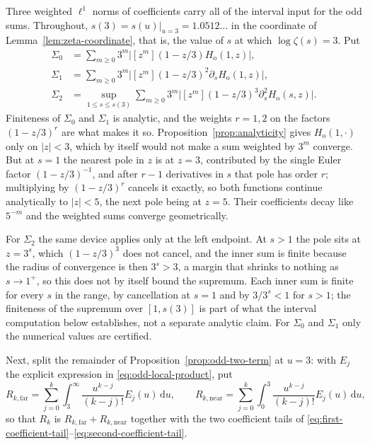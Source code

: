 \documentclass[11pt]{amsart}
\theoremstyle{plain}
\theoremstyle{definition}
\newcommand{\dd}{\,\mathrm d}
\newcommand{\abs}[1]{\lvert #1\rvert}
\begin{document}
Three weighted $\ell^1$ norms of coefficients carry all of the interval
input for the odd sums. Throughout, $s(3)=s(u)\rvert_{u=3}=1.0512\ldots$ in the
coordinate of Lemma~\ref{lem:zeta-coordinate}, that is, the value of $s$ at
which $\log\zeta(s)=3$. Put
\begin{equation}\label{eq:sigma-def}
\begin{aligned}
 \Sigma_0&=\sum_{m\geq0}3^m
   \abs{[z^m](1-z/3)H_{\mathrm o}(1,z)},\\
 \Sigma_1&=\sum_{m\geq0}3^m
   \abs{[z^m](1-z/3)^2\partial_sH_{\mathrm o}(1,z)},\\
 \Sigma_2&=\sup_{1\leq s\leq s(3)}
   \sum_{m\geq0}3^m
   \abs{[z^m](1-z/3)^3\partial_s^2H_{\mathrm o}(s,z)}.
\end{aligned}
\end{equation}
Finiteness of $\Sigma_0$ and $\Sigma_1$ is analytic, and the weights $r=1,2$ on
the factors $(1-z/3)^r$ are what makes it so.
Proposition~\ref{prop:analyticity} gives $H_{\mathrm o}(1,\cdot)$ only on
$\abs z<3$, which by itself would not make a sum weighted by $3^m$ converge.
But at $s=1$ the nearest pole in $z$ is at $z=3$, contributed by the single
Euler factor $(1-z/3)^{-1}$, and after $r-1$ derivatives in $s$ that pole has
order $r$; multiplying by $(1-z/3)^r$ cancels it exactly, so both functions
continue analytically to $\abs z<5$, the next pole being at $z=5$. Their
coefficients decay like $5^{-m}$ and the weighted sums converge geometrically.

For $\Sigma_2$ the same device applies only at the left endpoint. At $s>1$ the
pole sits at $z=3^s$, which $(1-z/3)^3$ does not cancel, and the inner sum is
finite because the radius of convergence is then $3^s>3$, a margin that
shrinks to nothing as $s\to1^+$, so this does not by itself bound the
supremum. Each inner sum is finite for every $s$ in the range, by cancellation
at $s=1$ and by $3/3^s<1$ for $s>1$; the finiteness of the supremum over
$[1,s(3)]$ is part of what the interval computation below establishes, not a
separate analytic claim. For $\Sigma_0$ and $\Sigma_1$ only the numerical
values are certified.

Next, split the remainder of Proposition~\ref{prop:odd-two-term} at $u=3$:
with $E_j$ the explicit expression in \eqref{eq:odd-local-product}, put
\begin{equation}\label{eq:near-far-split}
 R_{k,\mathrm{far}}=\sum_{j=0}^k\int_3^\infty
   \frac{u^{k-j}}{(k-j)!}E_j(u)\dd u,
 \qquad
 R_{k,\mathrm{near}}=\sum_{j=0}^k\int_0^3
   \frac{u^{k-j}}{(k-j)!}E_j(u)\dd u,
\end{equation}
so that $R_k$ is $R_{k,\mathrm{far}}+R_{k,\mathrm{near}}$ together with the two
coefficient tails of
\eqref{eq:first-coefficient-tail}--\eqref{eq:second-coefficient-tail}.
\end{document}
